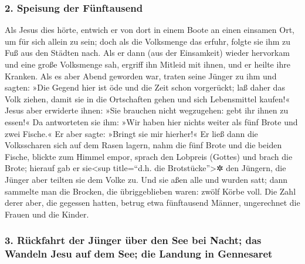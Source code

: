 \hypertarget{speisung-der-fuxfcnftausend}{%
\subsubsection{2. Speisung der
Fünftausend}\label{speisung-der-fuxfcnftausend}}

 Als Jesus dies hörte, entwich er von dort in einem Boote
an einen einsamen Ort, um für sich allein zu sein; doch als die
Volksmenge das erfuhr, folgte sie ihm zu Fuß aus den Städten nach.
 Als er dann (aus der Einsamkeit) wieder hervorkam und
eine große Volksmenge sah, ergriff ihn Mitleid mit ihnen, und er heilte
ihre Kranken.  Als es aber Abend geworden war, traten
seine Jünger zu ihm und sagten: »Die Gegend hier ist öde und die Zeit
schon vorgerückt; laß daher das Volk ziehen, damit sie in die
Ortschaften gehen und sich Lebensmittel kaufen!«  Jesus
aber erwiderte ihnen: »Sie brauchen nicht wegzugehen: gebt ihr ihnen zu
essen!«  Da antworteten sie ihm: »Wir haben hier nichts
weiter als fünf Brote und zwei Fische.«  Er aber sagte:
»Bringt sie mir hierher!«  Er ließ dann die Volksscharen
sich auf dem Rasen lagern, nahm die fünf Brote und die beiden Fische,
blickte zum Himmel empor, sprach den Lobpreis (Gottes) und brach die
Brote; hierauf gab er sie\textless sup title=``d.h. die
Brotstücke''\textgreater✲ den Jüngern, die Jünger aber teilten sie dem
Volke zu.  Und sie aßen alle und wurden satt; dann
sammelte man die Brocken, die übriggeblieben waren: zwölf Körbe voll.
 Die Zahl derer aber, die gegessen hatten, betrug etwa
fünftausend Männer, ungerechnet die Frauen und die Kinder.

\hypertarget{ruxfcckfahrt-der-juxfcnger-uxfcber-den-see-bei-nacht-das-wandeln-jesu-auf-dem-see-die-landung-in-gennesaret}{%
\subsubsection{3. Rückfahrt der Jünger über den See bei Nacht; das
Wandeln Jesu auf dem See; die Landung in
Gennesaret}\label{ruxfcckfahrt-der-juxfcnger-uxfcber-den-see-bei-nacht-das-wandeln-jesu-auf-dem-see-die-landung-in-gennesaret}}

